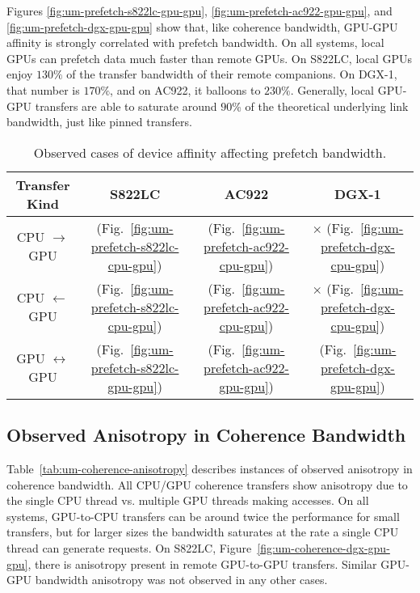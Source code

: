 Figures \ref{fig:um-prefetch-s822lc-gpu-gpu}, \ref{fig:um-prefetch-ac922-gpu-gpu}, and \ref{fig:um-prefetch-dgx-gpu-gpu} show that, like coherence bandwidth, GPU-GPU affinity is strongly correlated with prefetch bandwidth.
On all systems, local GPUs can prefetch data much faster than remote GPUs.
On S822LC, local GPUs enjoy $130\%$ of the transfer bandwidth of their remote companions.
On DGX-1, that number is $170\%$, and on AC922, it balloons to $230\%$.
Generally, local GPU-GPU transfers are able to saturate around $90$\% of the theoretical underlying link bandwidth, just like pinned transfers.

\begin{table}[ht]
	\centering
	\caption[Device affinity and prefetch bandwidth]{
		Observed cases of device affinity affecting prefetch bandwidth.
	}
	\label{tab:um-prefetch-affinity}
	\begin{tabular}{cccc}
		\hline
		\textbf{Transfer Kind}    & \textbf{S822LC}                                        & \textbf{AC922}                                        & \textbf{DGX-1}                                      \\ \hline 
		CPU $\rightarrow$     GPU & \checkmark (Fig.~\ref{fig:um-prefetch-s822lc-cpu-gpu}) & \checkmark (Fig.~\ref{fig:um-prefetch-ac922-cpu-gpu}) & $\times$   (Fig.~\ref{fig:um-prefetch-dgx-cpu-gpu}) \\ \hline
		CPU $\leftarrow$      GPU & \checkmark (Fig.~\ref{fig:um-prefetch-s822lc-cpu-gpu}) & \checkmark (Fig.~\ref{fig:um-prefetch-ac922-cpu-gpu}) & $\times$   (Fig.~\ref{fig:um-prefetch-dgx-cpu-gpu}) \\ \hline
		GPU $\leftrightarrow$ GPU & \checkmark (Fig.~\ref{fig:um-prefetch-s822lc-gpu-gpu}) & \checkmark (Fig.~\ref{fig:um-prefetch-ac922-gpu-gpu}) & \checkmark (Fig.~\ref{fig:um-prefetch-dgx-gpu-gpu}) \\ \hline
	\end{tabular}
\end{table}

\subsection{Observed Anisotropy in Coherence Bandwidth}

Table~\ref{tab:um-coherence-anisotropy} describes instances of observed anisotropy in coherence bandwidth.
All CPU/GPU coherence transfers show anisotropy due to the single CPU thread vs. multiple GPU threads making accesses.
On all systems, GPU-to-CPU transfers can be around twice the performance for small transfers, but for larger sizes the bandwidth saturates at the rate a single CPU thread can generate requests.
On S822LC, Figure~\ref{fig:um-coherence-dgx-gpu-gpu}, there is anisotropy present in remote GPU-to-GPU transfers.
Similar GPU-GPU bandwidth anisotropy was not observed in any other cases.

